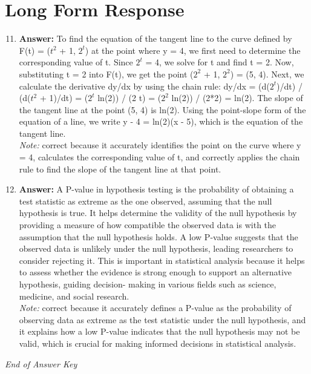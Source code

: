 \documentclass[12pt]{article}
\begin{document}
\section*{Long Form Response}
\begin{enumerate}[label=\arabic*.]
\setcounter{enumi}{10}
\item \textbf{Answer:} To find the equation of the tangent line to the curve defined by F(t) = ($t^2$ + 1, $2^t$) at the point where y = 4, we first need to determine the corresponding value of t. Since $2^t$ = 4, we solve for t and find t = 2. Now, substituting t = 2 into F(t), we get the point ($2^2$ + 1, $2^2$) = (5, 4). Next, we calculate the derivative dy/dx by using the chain rule: dy/dx = (d($2^t$)/dt) / (d($t^2$ + 1)/dt) = ($2^t$ ln(2)) / (2 t) = ($2^2$ ln(2)) / (2*2) = ln(2). The slope of the tangent line at the point (5, 4) is ln(2). Using the point-slope form of the equation of a line, we write y - 4 = ln(2)(x - 5), which is the equation of the tangent line.
\\ \textit{Note:} correct because it accurately identifies the point on the curve where y = 4, calculates the corresponding value of t, and correctly applies the chain rule to find the slope of the tangent line at that point.
\item \textbf{Answer:} A P-value in hypothesis testing is the probability of obtaining a test statistic as extreme as the one observed, assuming that the null hypothesis is true. It helps determine the validity of the null hypothesis by providing a measure of how compatible the observed data is with the assumption that the null hypothesis holds. A low P-value suggests that the observed data is unlikely under the null hypothesis, leading researchers to consider rejecting it. This is important in statistical analysis because it helps to assess whether the evidence is strong enough to support an alternative hypothesis, guiding decision- making in various fields such as science, medicine, and social research.
\\ \textit{Note:} correct because it accurately defines a P-value as the probability of observing data as extreme as the test statistic under the null hypothesis, and it explains how a low P-value indicates that the null hypothesis may not be valid, which is crucial for making informed decisions in statistical analysis.
\end{enumerate}

\vfill
\noindent\textit{End of Answer Key}
\end{document}
